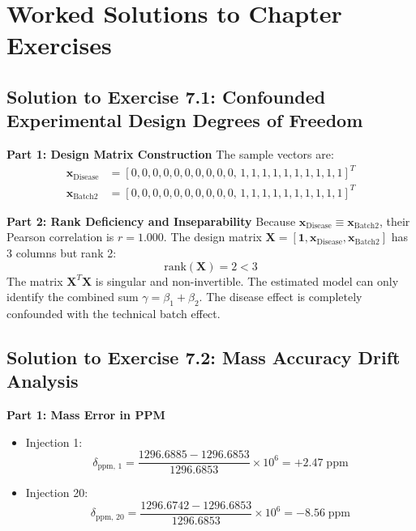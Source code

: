 \documentclass[11pt,twoside,openright]{book}
\begin{document}
\FloatBarrier

\section{Worked Solutions to Chapter Exercises}
\label{sec:solutions}

\subsection{Solution to Exercise 7.1: Confounded Experimental Design Degrees of Freedom}
\noindent\textbf{Part 1: Design Matrix Construction}\enspace
The sample vectors are:
\begin{align}
\mathbf{x}_{\text{Disease}} &= [0, 0, 0, 0, 0, 0, 0, 0, 0, 0, \, 1, 1, 1, 1, 1, 1, 1, 1, 1, 1]^T \\
\mathbf{x}_{\text{Batch2}}   &= [0, 0, 0, 0, 0, 0, 0, 0, 0, 0, \, 1, 1, 1, 1, 1, 1, 1, 1, 1, 1]^T
\end{align}

\noindent\textbf{Part 2: Rank Deficiency and Inseparability}\enspace
Because $\mathbf{x}_{\text{Disease}} \equiv \mathbf{x}_{\text{Batch2}}$, their Pearson correlation is $r = 1.000$. The design matrix $\mathbf{X} = [\mathbf{1}, \mathbf{x}_{\text{Disease}}, \mathbf{x}_{\text{Batch2}}]$ has 3 columns but rank 2:
\begin{equation}
\text{rank}(\mathbf{X}) = 2 < 3
\end{equation}
The matrix $\mathbf{X}^T \mathbf{X}$ is singular and non-invertible. The estimated model can only identify the combined sum $\gamma = \beta_1 + \beta_2$. The disease effect is completely confounded with the technical batch effect.

\subsection{Solution to Exercise 7.2: Mass Accuracy Drift Analysis}
\noindent\textbf{Part 1: Mass Error in PPM}\enspace
\begin{itemize}
    \item Injection 1:
    \begin{equation}
    \delta_{\text{ppm, 1}} = \frac{1296.6885 - 1296.6853}{1296.6853} \times 10^6 = +2.47\;\text{ppm}
    \end{equation}
    \item Injection 20:
    \begin{equation}
    \delta_{\text{ppm, 20}} = \frac{1296.6742 - 1296.6853}{1296.6853} \times 10^6 = -8.56\;\text{ppm}
    \end{equation}
\end{itemize}
\end{document}
